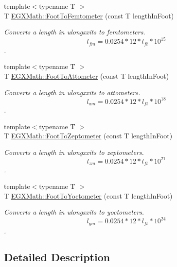 \begin{DoxyCompactItemize}
{\footnotesize template$<$typename T $>$ }\\T \mbox{\hyperlink{group___e_g_x_math-_conversions-_length_conversions-_imperial-_foot-_s_i_gac178ec8356add4e77a27766831cb7247}{E\+G\+X\+Math\+::\+Foot\+To\+Femtometer}} (const T length\+In\+Foot)
\begin{DoxyCompactList}\small\item\em Converts a length in ulongxxits to femtometers. \[ l_{fm}=0.0254 * 12 * l_{ft} * 10^{15} \]. \end{DoxyCompactList}\item 
{\footnotesize template$<$typename T $>$ }\\T \mbox{\hyperlink{group___e_g_x_math-_conversions-_length_conversions-_imperial-_foot-_s_i_ga3831d7a5d7bced625576f0d07644cf24}{E\+G\+X\+Math\+::\+Foot\+To\+Attometer}} (const T length\+In\+Foot)
\begin{DoxyCompactList}\small\item\em Converts a length in ulongxxits to attometers. \[ l_{am}=0.0254 * 12 * l_{ft} * 10^{18} \]. \end{DoxyCompactList}\item 
{\footnotesize template$<$typename T $>$ }\\T \mbox{\hyperlink{group___e_g_x_math-_conversions-_length_conversions-_imperial-_foot-_s_i_ga6418a94f8c9855745fc9eb05c6aa121e}{E\+G\+X\+Math\+::\+Foot\+To\+Zeptometer}} (const T length\+In\+Foot)
\begin{DoxyCompactList}\small\item\em Converts a length in ulongxxits to zeptometers. \[ l_{zm}=0.0254 * 12 * l_{ft} * 10^{21} \]. \end{DoxyCompactList}\item 
{\footnotesize template$<$typename T $>$ }\\T \mbox{\hyperlink{group___e_g_x_math-_conversions-_length_conversions-_imperial-_foot-_s_i_ga6a04aa5a8be3bebe58307e334d433a40}{E\+G\+X\+Math\+::\+Foot\+To\+Yoctometer}} (const T length\+In\+Foot)
\begin{DoxyCompactList}\small\item\em Converts a length in ulongxxits to yoctometers. \[ l_{ym}=0.0254 * 12 * l_{ft} * 10^{24} \]. \end{DoxyCompactList}\end{DoxyCompactItemize}


\subsection{Detailed Description}


